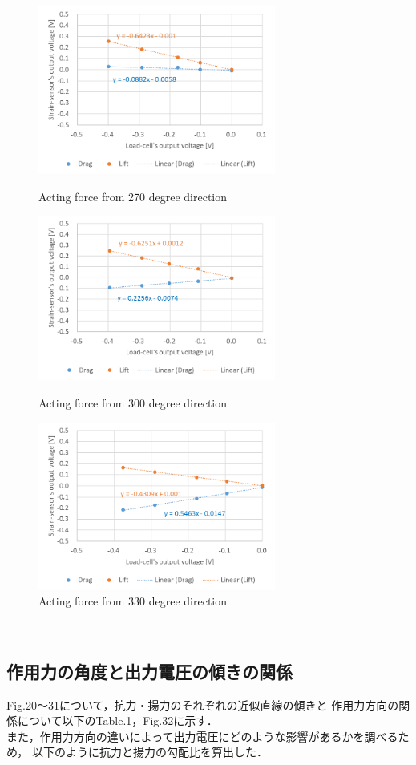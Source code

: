 \documentclass[twocolumn,a4j]{jsarticle}
\begin{document}
\begin{figure}[htbp]
    \footnotesize
    \begin{center}
        \includegraphics[width=78mm]{../images/270.png}
        \caption{Acting force from 270 degree direction}
        \includegraphics[width=78mm]{../images/300.png}
        \caption{Acting force from 300 degree direction}
        \includegraphics[width=78mm]{../images/330.png}
        \caption{Acting force from 330 degree direction}
    \end{center}
\end{figure}
　
\newpage
\newpage
\;
\newpage
\;
\newpage

\subsection{作用力の角度と出力電圧の傾きの関係}

Fig.20～31について，抗力・揚力のそれぞれの近似直線の傾きと
作用力方向の関係について以下のTable.1，Fig.32に示す．\\
また，作用力方向の違いによって出力電圧にどのような影響があるかを調べるため，
以下のように抗力と揚力の勾配比を算出した．\\
\end{document}
